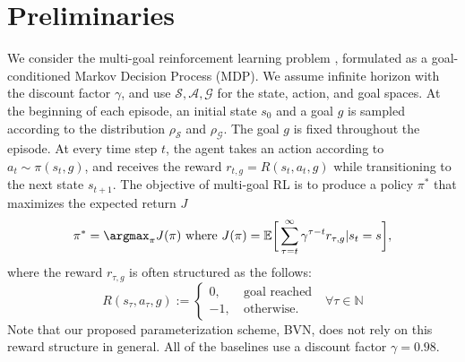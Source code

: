 \documentclass[dvipsnames]{article} %
\theoremstyle{definition}
\theoremstyle{remark}
\begin{document}
\section{Preliminaries}
\label{sec:preliminary}

We consider the multi-goal reinforcement learning problem \citep{Kaelbling1993goals,plappert2018multi}, formulated as a goal-conditioned Markov Decision Process (MDP). We assume infinite horizon with the discount factor \(\gamma\), and use \(\mathcal S, \mathcal A, \mathcal G\) for the state, action, and goal spaces. At the beginning of each episode, an initial state \(s_0\) and a goal $g$ is sampled according to the distribution \(\rho_\mathcal S\) and \(\rho_\mathcal G\). The goal \(g\) is fixed throughout the episode. At every time step $t$, the agent takes an action according to $a_t \sim \pi(s_t, g)$, and receives the reward $r_{t,g} = R(s_t,a_t,g)$ while transitioning to the next state $s_{t+1}$. The objective of multi-goal RL is to produce a policy \(\pi^*\) that maximizes the expected return \(J\)
\begin{equation}\label{eq:policy}
\pi^* = \argmax_\pi  J(\pi)\text{ where   }  J (\pi) = \mathbb{E} \bigg[ \sum^{\infty}_{\tau=t}  \gamma^{\tau - t} r_{\tau,g} | s_t = s\bigg],
\end{equation}
where the reward $r_{\tau,g}$ is often structured as the follows:
\begin{equation}
    R(s_\tau, a_\tau, g) := \begin{cases}
        0, &~\text{goal reached}\\
        -1, &~\text{otherwise}.
    \end{cases}
    ~~~\forall \tau \in \mathbb{N}
\end{equation}
Note that our proposed parameterization scheme, BVN, does not rely on this reward structure in general. All of the baselines use a discount factor $\gamma =0.98$. 
\end{document}
